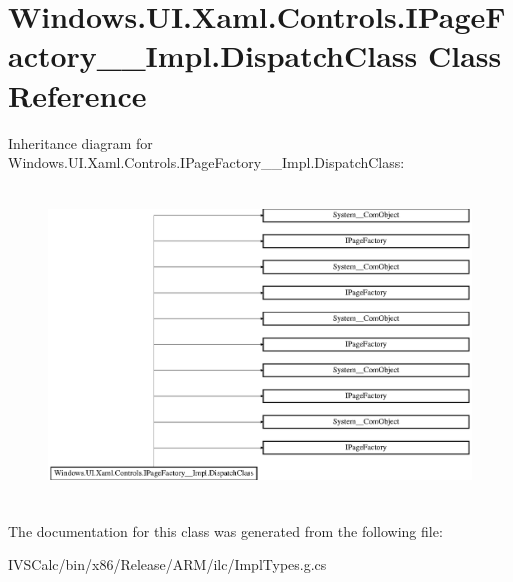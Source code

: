 \hypertarget{class_windows_1_1_u_i_1_1_xaml_1_1_controls_1_1_i_page_factory_____impl_1_1_dispatch_class}{}\section{Windows.\+U\+I.\+Xaml.\+Controls.\+I\+Page\+Factory\+\_\+\+\_\+\+Impl.\+Dispatch\+Class Class Reference}
\label{class_windows_1_1_u_i_1_1_xaml_1_1_controls_1_1_i_page_factory_____impl_1_1_dispatch_class}
Inheritance diagram for Windows.\+U\+I.\+Xaml.\+Controls.\+I\+Page\+Factory\+\_\+\+\_\+\+Impl.\+Dispatch\+Class\+:\begin{figure}[H]
\begin{center}
\leavevmode
\includegraphics[height=8.369565cm]{class_windows_1_1_u_i_1_1_xaml_1_1_controls_1_1_i_page_factory_____impl_1_1_dispatch_class}
\end{center}
\end{figure}


The documentation for this class was generated from the following file\+:\begin{DoxyCompactItemize}
\item 
I\+V\+S\+Calc/bin/x86/\+Release/\+A\+R\+M/ilc/Impl\+Types.\+g.\+cs\end{DoxyCompactItemize}
